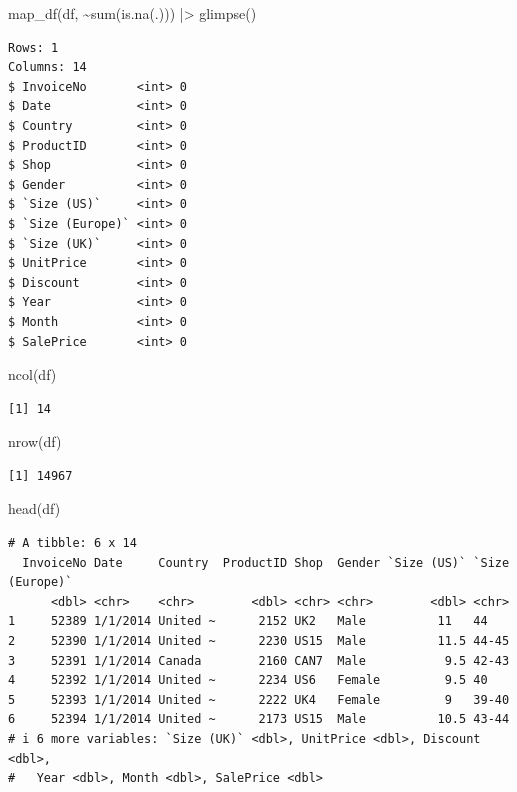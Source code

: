 \documentclass[
  letterpaper,
  DIV=11,
  numbers=noendperiod]{scrreprt}
\newenvironment{Shaded}{\begin{snugshade}}{\end{snugshade}}
\newcommand{\FunctionTok}[1]{\textcolor[rgb]{0.28,0.35,0.67}{#1}}
\newcommand{\NormalTok}[1]{\textcolor[rgb]{0.00,0.23,0.31}{#1}}
\newcommand{\SpecialCharTok}[1]{\textcolor[rgb]{0.37,0.37,0.37}{#1}}
\begin{document}
\begin{Shaded}
\begin{Highlighting}[]
\FunctionTok{map\_df}\NormalTok{(df, }\SpecialCharTok{\textasciitilde{}}\FunctionTok{sum}\NormalTok{(}\FunctionTok{is.na}\NormalTok{(.))) }\SpecialCharTok{|\textgreater{}}
     \FunctionTok{glimpse}\NormalTok{()}
\end{Highlighting}
\end{Shaded}

\begin{verbatim}
Rows: 1
Columns: 14
$ InvoiceNo       <int> 0
$ Date            <int> 0
$ Country         <int> 0
$ ProductID       <int> 0
$ Shop            <int> 0
$ Gender          <int> 0
$ `Size (US)`     <int> 0
$ `Size (Europe)` <int> 0
$ `Size (UK)`     <int> 0
$ UnitPrice       <int> 0
$ Discount        <int> 0
$ Year            <int> 0
$ Month           <int> 0
$ SalePrice       <int> 0
\end{verbatim}

\begin{Shaded}
\begin{Highlighting}[]
\FunctionTok{ncol}\NormalTok{(df)}
\end{Highlighting}
\end{Shaded}

\begin{verbatim}
[1] 14
\end{verbatim}

\begin{Shaded}
\begin{Highlighting}[]
\FunctionTok{nrow}\NormalTok{(df)}
\end{Highlighting}
\end{Shaded}

\begin{verbatim}
[1] 14967
\end{verbatim}

\begin{Shaded}
\begin{Highlighting}[]
\FunctionTok{head}\NormalTok{(df)}
\end{Highlighting}
\end{Shaded}

\begin{verbatim}
# A tibble: 6 x 14
  InvoiceNo Date     Country  ProductID Shop  Gender `Size (US)` `Size (Europe)`
      <dbl> <chr>    <chr>        <dbl> <chr> <chr>        <dbl> <chr>          
1     52389 1/1/2014 United ~      2152 UK2   Male          11   44             
2     52390 1/1/2014 United ~      2230 US15  Male          11.5 44-45          
3     52391 1/1/2014 Canada        2160 CAN7  Male           9.5 42-43          
4     52392 1/1/2014 United ~      2234 US6   Female         9.5 40             
5     52393 1/1/2014 United ~      2222 UK4   Female         9   39-40          
6     52394 1/1/2014 United ~      2173 US15  Male          10.5 43-44          
# i 6 more variables: `Size (UK)` <dbl>, UnitPrice <dbl>, Discount <dbl>,
#   Year <dbl>, Month <dbl>, SalePrice <dbl>
\end{verbatim}
\end{document}
